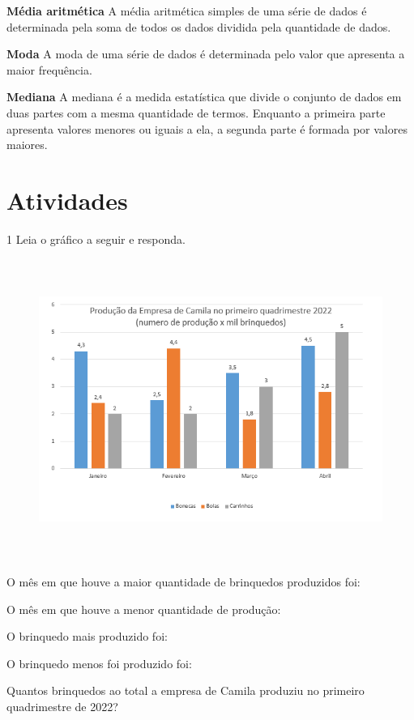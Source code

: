 {\smallskip\noindent\textbf{Média aritmética}
\quad
A média aritmética simples de uma série de dados é determinada pela soma
de todos os dados dividida pela quantidade de dados.

\smallskip\noindent\textbf{Moda}
\quad
A moda de uma série de dados é determinada pelo valor que apresenta a
maior frequência.

\smallskip\noindent\textbf{Mediana}
\quad
A mediana é a medida estatística que divide o conjunto de dados em duas
partes com a mesma quantidade de termos. Enquanto a primeira parte
apresenta valores menores ou iguais a ela, a segunda parte é formada por
valores maiores.}

\section{Atividades}

\num{1} Leia o gráfico a seguir e responda.

\begin{figure}[H]
\centering\includegraphics[width=5.90625in,height=3.86458in]{./imgSAEB_8_MAT/media/image39.png}
\end{figure}

\begin{escolha}[itemsep=0pt]
\item O mês em que houve a maior quantidade de brinquedos produzidos foi:
\item O mês em que houve a menor quantidade de produção:
\item O brinquedo mais produzido foi:
\item O brinquedo menos foi produzido foi:
\item Quantos brinquedos ao total a empresa de Camila produziu no primeiro quadrimestre de 2022?
\end{escolha}

